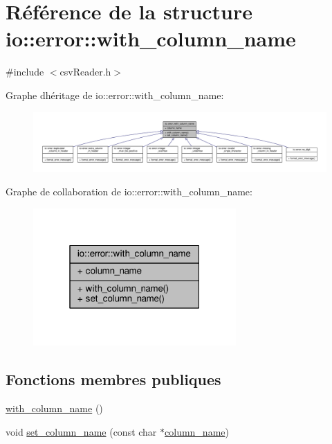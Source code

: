 \hypertarget{structio_1_1error_1_1with__column__name}{}\section{Référence de la structure io\+:\+:error\+:\+:with\+\_\+column\+\_\+name}
\label{structio_1_1error_1_1with__column__name}


{\ttfamily \#include $<$csv\+Reader.\+h$>$}



Graphe d\textquotesingle{}héritage de io\+:\+:error\+:\+:with\+\_\+column\+\_\+name\+:\nopagebreak
\begin{figure}[H]
\begin{center}
\leavevmode
\includegraphics[width=350pt]{structio_1_1error_1_1with__column__name__inherit__graph}
\end{center}
\end{figure}


Graphe de collaboration de io\+:\+:error\+:\+:with\+\_\+column\+\_\+name\+:\nopagebreak
\begin{figure}[H]
\begin{center}
\leavevmode
\includegraphics[width=220pt]{structio_1_1error_1_1with__column__name__coll__graph}
\end{center}
\end{figure}
\subsection*{Fonctions membres publiques}
\begin{DoxyCompactItemize}
\item 
\hyperlink{structio_1_1error_1_1with__column__name_a07d04d38dc87e6b20d2371695a3229c7}{with\+\_\+column\+\_\+name} ()
\item 
void \hyperlink{structio_1_1error_1_1with__column__name_a2a8144d3591a4bb618368ca7261befef}{set\+\_\+column\+\_\+name} (const char $\ast$\hyperlink{structio_1_1error_1_1with__column__name_af40ba00f1f035d363b099baf1f724323}{column\+\_\+name})
\end{DoxyCompactItemize}

